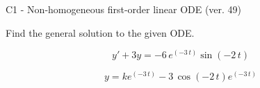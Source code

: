 \begin{exercise}
  \begin{exerciseTitle}C1 - Non-homogeneous first-order linear ODE (ver. 49)\end{exerciseTitle}
  \begin{exerciseStatement}
    
Find the general solution to the given ODE.

    
\[y'+3y= -6 \, e^{\left(-3 \, t\right)} \sin\left(-2 \, t\right)\]

  \end{exerciseStatement}
  \begin{exerciseAnswer}
    
\[y= k e^{\left(-3 \, t\right)} - 3 \, \cos\left(-2 \, t\right) e^{\left(-3 \, t\right)}\]

  \end{exerciseAnswer}
\end{exercise}